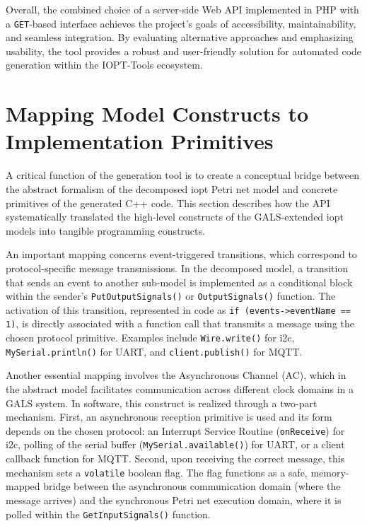 Overall, the combined choice of a server-side Web API implemented in PHP with a \texttt{GET}-based interface achieves the project's goals of accessibility, maintainability, and seamless integration. By evaluating alternative approaches and emphasizing usability, the tool provides a robust and user-friendly solution for automated code generation within the IOPT-Tools ecosystem.




\section{Mapping Model Constructs to Implementation Primitives}
\label{sec:mapping_constructs}

A critical function of the generation tool is to create a conceptual bridge between the abstract formalism of the decomposed \gls{iopt} Petri net model and concrete primitives of the generated C++ code. This section describes how the API systematically translated the high-level constructs of the GALS-extended \gls{iopt} models into tangible programming constructs.

An important mapping concerns event-triggered transitions, which correspond to protocol-specific message transmissions. In the decomposed model, a transition that sends an event to another sub-model is implemented as a conditional block within the sender's \texttt{PutOutputSignals()} or \texttt{OutputSignals()} function. The activation of this transition, represented in code as \texttt{if (events->eventName == 1)}, is directly associated with a function call that transmits a message using the chosen protocol primitive. Examples include \texttt{Wire.write()} for \gls{i2c}, \texttt{MySerial.println()} for UART, and \texttt{client.publish()} for MQTT.

Another essential mapping involves the Asynchronous Channel (AC), which in the abstract model facilitates communication across different clock domains in a GALS system. In software, this construct is realized through a two-part mechanism. First, an asynchronous reception primitive is used and its form depends on the chosen protocol: an Interrupt Service Routine (\texttt{onReceive}) for \gls{i2c}, polling of the serial buffer (\texttt{MySerial.available()}) for UART, or a client callback function for MQTT. Second, upon receiving the correct message, this mechanism sets a \texttt{volatile} boolean flag. The flag functions as a safe, memory-mapped bridge between the asynchronous communication domain (where the message arrives) and the synchronous Petri net execution domain, where it is polled within the \texttt{GetInputSignals()} function.

